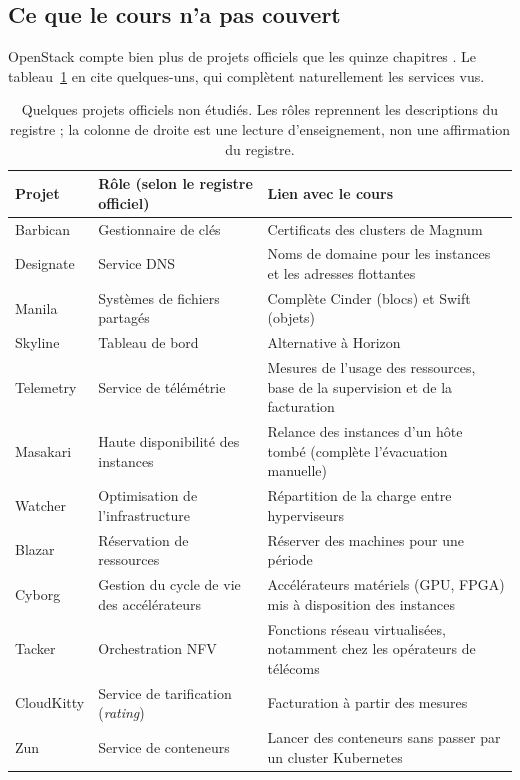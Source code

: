 \subsection*{Ce que le cours n'a pas couvert}

OpenStack compte bien plus de projets officiels que les quinze chapitres \parencite{governance-projects}. Le tableau~\ref{tab:concl-autres}
en cite quelques-uns, qui complètent naturellement les services vus.

\begin{table}[!ht]
\centering
\renewcommand{\arraystretch}{1.2}
\small
\begin{tabular}{@{}>{\raggedright\arraybackslash}p{2.5cm}>{\raggedright\arraybackslash}p{5.8cm}>{\raggedright\arraybackslash}p{7.1cm}@{}}
\toprule
\textbf{Projet} & \textbf{Rôle (selon le registre officiel)} & \textbf{Lien avec le cours} \\
\midrule
Barbican & Gestionnaire de clés & Certificats des clusters de Magnum \\
Designate & Service DNS & Noms de domaine pour les instances et les adresses flottantes \\
Manila & Systèmes de fichiers partagés & Complète Cinder (blocs) et Swift (objets) \\
Skyline & Tableau de bord & Alternative à Horizon \\
Telemetry & Service de télémétrie & Mesures de l'usage des ressources, base de la supervision et de la facturation \\
Masakari & Haute disponibilité des instances & Relance des instances d'un hôte tombé (complète l'évacuation manuelle) \\
Watcher & Optimisation de l'infrastructure & Répartition de la charge entre hyperviseurs \\
Blazar & Réservation de ressources & Réserver des machines pour une période \\
Cyborg & Gestion du cycle de vie des accélérateurs & Accélérateurs matériels (GPU, FPGA) mis à disposition des instances \\
Tacker & Orchestration NFV & Fonctions réseau virtualisées, notamment chez les opérateurs de télécoms \\
CloudKitty & Service de tarification (\emph{rating}) & Facturation à partir des mesures \\
Zun & Service de conteneurs & Lancer des conteneurs sans passer par un cluster Kubernetes \\
\bottomrule
\end{tabular}
\caption{Quelques projets officiels non étudiés. Les rôles reprennent les descriptions du registre ; la colonne de droite est une lecture
d'enseignement, non une affirmation du registre.}
\label{tab:concl-autres}
\end{table}


